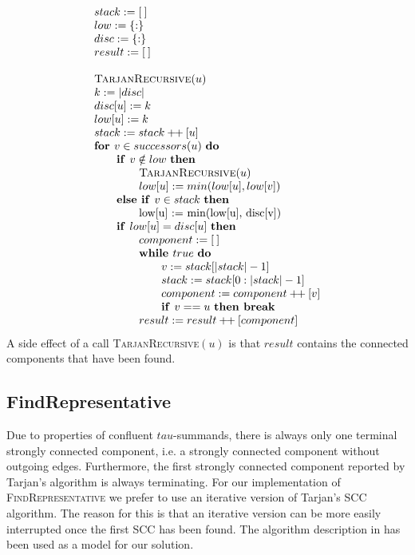 \documentclass{article}
\newcommand{\concat}{\ensuremath{+\!\!+\:}}
\newcommand{\emptymap}{\ensuremath{\{ : \}}}
\newcommand{\emptylist}{\ensuremath{[\:]}}
\newcommand{\If}{\text{\textbf{if }}}
\newcommand{\Do}{\text{\textbf{do }}}
\newcommand{\Then}{\text{\textbf{then }}}
\newcommand{\Else}{\text{\textbf{else }}}
\newcommand{\For}{\text{\textbf{for }}}
\newcommand{\While}{\text{\textbf{while }}}
\newcommand{\Break}{\text{\textbf{break }}}
\begin{document}
\[
\begin{tabular}{l}
$stack := \emptylist$ \\
$low := \emptymap$ \\
$disc := \emptymap$ \\
$result := \emptylist$ \\
\\
\textsc{TarjanRecursive}$(u)$ \\
$k := |disc|$ \\
$disc[u] := k$ \\
$low[u] := k$ \\
$stack := stack \concat [u]$ \\
\For $v \in successors(u)$ \Do \\
\qquad \If $v \notin low$ \Then \\
\qquad \qquad \textsc{TarjanRecursive}$(u)$ \\
\qquad \qquad $low[u] := min(low[u], low[v])$ \\
\qquad \Else \If $v \in stack$ \Then \\
\qquad \qquad low[u] := min(low[u], disc[v]) \\
\qquad \If $low[u] = disc[u]$ \Then \\
\qquad \qquad $component := \emptylist$ \\
\qquad \qquad \While $true$ \Do \\
\qquad \qquad \qquad $v := stack[|stack| - 1]$ \\
\qquad \qquad \qquad $stack := stack[0:|stack| - 1]$ \\
\qquad \qquad \qquad $component := component \concat [v]$ \\
\qquad \qquad \qquad \If $v == u$ \Then \Break \\
\qquad \qquad $result := result \concat [component]$ \\
\end{tabular}
\]
A side effect of a call \textsc{TarjanRecursive}$(u)$ is that $result$ contains the connected components that have been found.

\subsection{FindRepresentative}
Due to properties of confluent $tau$-summands, there is always only one terminal strongly connected component, i.e. a strongly connected component without outgoing edges. Furthermore, the first strongly connected component reported by Tarjan's algorithm is always terminating. For our implementation of \textsc{FindRepresentative} we prefer to use an iterative version of Tarjan's SCC algorithm. The reason for this is that an iterative version can be more easily interrupted once the first SCC has been found. The algorithm description in \cite{TarjanIterative} has been used as a model for our solution.
\end{document}

